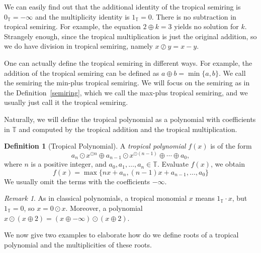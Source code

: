 \documentclass{amsart}
\theoremstyle{definition}
\newtheorem{defn}{Definition}[section]
\theoremstyle{remark}
\newtheorem{rmk}{Remark}[section]
\begin{document}
We can easily find out that the additional identity of the tropical semiring is ${0_{\mathbb{T}}} = -\infty$ and the multiplicity identity is ${1_{\mathbb{T}}} = 0$. There is no subtraction in tropical semiring. For example, the equation $2 {\oplus} k = 3$ yields no solution for $k$. Strangely enough, since the tropical multiplication is just the original addition, so we do have division in tropical semiring, namely $x {\oslash} y = x - y$.

One can actually define the tropical semiring in different ways. For example, the addition of the tropical semiring can be defined as $a {\oplus} b = \min \{a, b\}$. We call the semiring the min-plus tropical semiring. We will focus on the semiring as in the Definition~\ref{semiring}, which we call the max-plus tropical semiring, and we usually just call it the tropical semiring.

Naturally, we will define the tropical polynomial as a polynomial with coefficients in ${\mathbb{T}}$ and computed by the tropical addition and the tropical multiplication.

\begin{defn}[Tropical Polynomial]
A \emph{tropical polynomial} $f(x)$ is of the form 
\[
a_n {\odot} x^{{\odot} n} {\oplus} a_{n-1} {\odot} x^{{\odot} (n-1)} {\oplus} \cdots {\oplus} a_0,
\]
where $n$ is a positive integer, and $a_0, a_1, \ldots, a_n \in {\mathbb{T}}$. Evaluate $f(x)$, we obtain
\[
f(x) = \max \{ nx + a_n, (n-1)x + a_{n-1},  \ldots, a_0 \}
\]
We usually omit the terms with the coefficients $-\infty$.
\end{defn}

\begin{rmk}
As in classical polynomials, a tropical monomial $x$ means $1_{\mathbb{T}} \cdot x$, but $1_{\mathbb{T}} = 0$, so $x = 0 {\odot} x$. Moreover, a polynomial $x {\odot} (x {\oplus} 2) = (x {\oplus} -\infty) {\odot} (x {\oplus} 2)$.
\end{rmk}

We now give two examples to elaborate how do we define roots of a tropical polynomial and the multiplicities of these roots.
\end{document}
